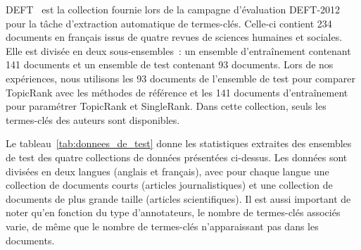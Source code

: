         DEFT~\cite{paroubek2012deft} est la collection fournie lors de la
        campagne d'évaluation DEFT-2012 pour la tâche d'extraction automatique
        de termes-clés. Celle-ci contient 234 documents en français issus de
        quatre revues de sciences humaines et sociales. Elle est divisée en deux
        sous-ensembles~: un ensemble d'entraînement contenant 141 documents et
        un ensemble de test contenant 93 documents. Lors de nos expériences,
        nous utilisons les 93 documents de l'ensemble de test pour comparer
        TopicRank avec les méthodes de référence et les 141 documents
        d'entraînement pour paramétrer TopicRank et SingleRank. Dans cette
        collection, seuls les termes-clés des auteurs sont disponibles.

        Le tableau~\ref{tab:donnees_de_test} donne les statistiques extraites
        des ensembles de test des quatre collections de données présentées
        ci-dessus. Les données sont divisées en deux langues (anglais et
        français), avec pour chaque langue une collection de documents courts
        (articles journalistiques) et une collection de documents de plus grande
        taille (articles scientifiques). Il est aussi important de noter qu'en
        fonction du type d'annotateurs, le nombre de termes-clés associés varie,
        de même que le nombre de termes-clés n'apparaissant pas dans les
        documents.
